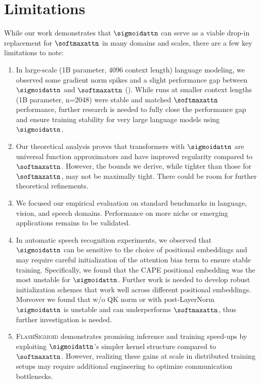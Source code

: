 \section{Limitations}
\label{sec:limitations}

While our work demonstrates that $\sigmoidattn$ can serve as a viable drop-in replacement for $\softmaxattn$ in many domains and scales, there are a few key limitations to note:

\begin{enumerate}
    \item In large-scale (1B parameter, 4096 context length) language modeling, we observed some gradient norm spikes and a slight performance gap between $\sigmoidattn$ and $\softmaxattn$ (). While runs at smaller context lengths (1B parameter, n=2048) were stable and matched $\softmaxattn$ performance, further research is needed to fully close the performance gap and ensure training stability for very large language models using $\sigmoidattn$.
    \item Our theoretical analysis proves that transformers with $\sigmoidattn$ are universal function approximators and have improved regularity compared to $\softmaxattn$. However, the bounds we derive, while tighter than those for $\softmaxattn$, may not be maximally tight. There could be room for further theoretical refinements.
    \item We focused our empirical evaluation on standard benchmarks in language, vision, and speech domains. Performance on more niche or emerging applications remains to be validated. 
    \item In automatic speech recognition experiments, we observed that $\sigmoidattn$ can be sensitive to the choice of positional embeddings and may require careful initialization of the attention bias term to ensure stable training. Specifically, we found that the CAPE positional embedding was the most unstable for $\sigmoidattn$. Further work is needed to develop robust initialization schemes that work well across different positional embeddings. Moreover we found that w/o QK norm or with post-LayerNorm $\sigmoidattn$ is unstable and can underperforms $\softmaxattn$, thus further investigation is needed.
    \item \textsc{FlashSigmoid} demonstrates promising inference and training speed-ups by exploiting $\sigmoidattn$'s simpler kernel structure compared to $\softmaxattn$. However, realizing these gains at scale in distributed training setups may require additional engineering to optimize communication bottlenecks.
\end{enumerate}

